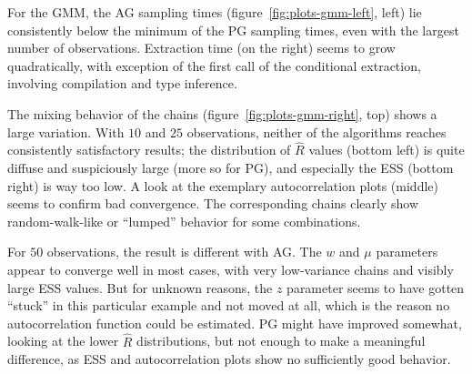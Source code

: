 For the GMM, the AG sampling times (figure~\ref{fig:plots-gmm-left}, left) lie consistently below the
minimum of the PG sampling times, even with the largest number of observations.  Extraction time
(on the right) seems to grow quadratically, with exception of the first call of
the conditional extraction, involving compilation and type inference.

The mixing behavior of the chains (figure~\ref{fig:plots-gmm-right}, top) shows a large variation.
With \(10\) and \(25\) observations, neither of the algorithms reaches consistently satisfactory
results; the distribution of \(\widehat{R}\) values (bottom left) is quite diffuse and suspiciously
large (more so for PG), and especially the ESS (bottom right) is way too low.  A look at the
exemplary autocorrelation plots (middle) seems to confirm bad convergence.  The corresponding chains
clearly show random-walk-like or \enquote{lumped} behavior for some combinations.

For \(50\) observations, the result is different with AG.  The \(w\) and \(\mu\) parameters appear
to converge well in most cases, with very low-variance chains and visibly large ESS values.  But for
unknown reasons, the \(z\) parameter seems to have gotten \enquote{stuck} in this particular example
and not moved at all, which is the reason no autocorrelation function could be estimated.  PG might
have improved somewhat, looking at the lower \(\widehat{R}\) distributions, but not enough to make a
meaningful difference, as ESS and autocorrelation plots show no sufficiently good behavior.


\cleartorecto
\FloatBlock

